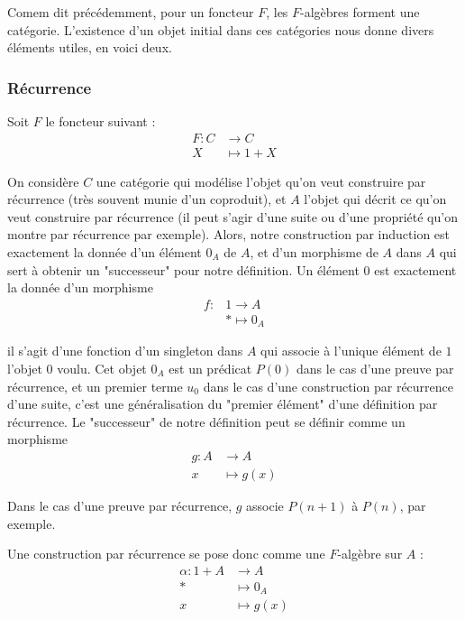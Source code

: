 \documentclass{article}
\begin{document}
Comem dit précédemment, pour un foncteur $F$, les $F$-algèbres forment une catégorie. L'existence d'un objet initial dans ces catégories nous donne divers éléments utiles, en voici deux. 

\subsubsection{Récurrence}

Soit $F$ le foncteur suivant : 
\begin{align*}
    F : C & \rightarrow C \\ 
    X & \mapsto 1 + X
\end{align*}

On considère $C$ une catégorie qui modélise l'objet qu'on veut construire par récurrence (très souvent munie d'un coproduit), et $A$ l'objet qui décrit ce qu'on veut construire par récurrence (il peut s'agir d'une suite ou d'une propriété qu'on montre par récurrence par exemple). Alors, notre construction par induction est exactement la donnée d'un élément $0_A$ de $A$, et d'un morphisme de $A$ dans $A$ qui sert à obtenir un "successeur" pour notre définition. Un élément $0$ est exactement la donnée d'un morphisme  
\begin{align*}
f : & 1  \rightarrow A \\
    & * \mapsto 0_A
    
\end{align*}

il s'agit d'une fonction d'un singleton dans $A$ qui associe à l'unique élément de $1$ l'objet $0$ voulu. Cet objet $0_A$ est un prédicat $P(0)$ dans le cas d'une preuve par récurrence, et un premier terme $u_0$ dans le cas d'une construction par récurrence d'une suite, c'est une généralisation du "premier élément" d'une définition par récurrence. Le "successeur" de notre définition peut se définir comme un morphisme \begin{align*}
    g : A &  \rightarrow A \\ 
        x & \mapsto g(x)
\end{align*}

Dans le cas d'une preuve par récurrence, $g$ associe $P(n+1)$ à $P(n)$, par exemple.
    
     Une construction par récurrence se pose donc comme une $F$-algèbre sur $A$ :
\begin{align*}
    \alpha : 1 + A & \rightarrow A \\ 
    * & \mapsto 0_A \\ 
    x & \mapsto g(x)
\end{align*}
\end{document}
